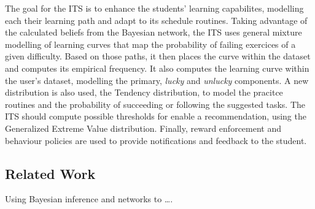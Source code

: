 \documentclass{article}
\newcommand{\0}{\mathbbold{0}}
\newcommand{\1}{\mathds{1}}
\newcommand{\2}{\mathbbold{2}}
\begin{document}
    The goal for the ITS is to enhance the students' learning capabilites, modelling each their learning path and adapt to its schedule routines.
    Taking advantage of the calculated beliefs from the Bayesian network, the ITS uses general mixture modelling of learning curves that map the probability of failing exercices of a given difficulty.
    Based on those paths, it then places the curve within the dataset and computes its empirical frequency. It also computes the learning curve within the user's dataset, modelling the primary, \textsl{lucky} and \textsl{unlucky} components.
    A new distribution is also used, the Tendency distribution, to model the pracitce routines and the probability of succeeding or following the suggested tasks. The ITS should compute possible thresholds for enable a recommendation, using the Generalized Extreme Value distribution.
    Finally, reward enforcement and behaviour policies are used to provide notifications and feedback to the student.
\subsection{Related Work}
Using Bayesian inference and networks to \dots \cite{duolingo2020,duolingo2015,bandit2014,gamboa2001,fuzzy2020,noriega2017,siacua}.
\end{document}

